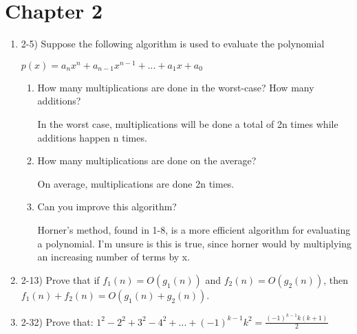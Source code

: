 \documentclass{article}
\begin{document}
\section{Chapter 2}
\begin{enumerate}
    \item 2-5) Suppose the following algorithm is used to evaluate the polynomial
    
    \(p(x)=a_nx^n+a_{n-1}x^{n-1}+...+a_1x+a_0\)
    
    \begin{center}
    \end{center}
    \begin{enumerate}
        \item How many multiplications are done in the worst-case? How many additions?

        In the worst case, multiplications will be done a total of 2n times while additions happen n times.

        \item How many multiplications are done on the average?

        On average, multiplications are done 2n times.
        
        \item Can you improve this algorithm?

        Horner's method, found in 1-8, is a more efficient algorithm for evaluating a polynomial.
        I'm unsure is this is true, since horner would by multiplying an increasing number of terms by x.
        
    \end{enumerate}
    \item 2-13) Prove that if $f_1(n) =O(g_1(n))$ and $f_2(n)=O(g_2(n))$, then $f_1(n)+f_2(n)=O(g_1(n)+g_2(n))$.

    

    \item 2-32) Prove that: 
    \(1^2-2^2+3^2-4^2+...+(-1)^{k-1}k^2=\frac{(-1)^{k-1}k(k+1)}{2}\)


\end{enumerate}
\end{document}
